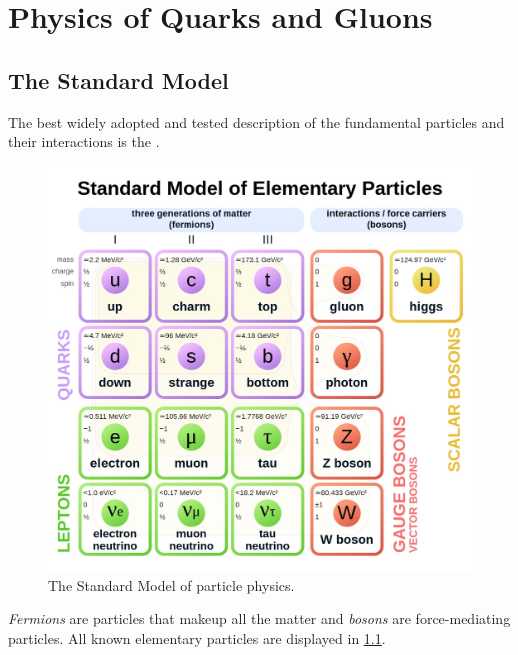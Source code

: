 \chapter{Physics of Quarks and Gluons}

\section{The Standard Model}
\label{sec:sm}
The best widely adopted and tested description of the fundamental particles and their interactions is the \SM \cite{pdg}. 
\begin{figure}[htb]
    \centering
    \includegraphics[width=0.6\linewidth]{src/img/sm.jpg}
    \caption[The Standard Model of particle physics.]{The Standard Model of particle physics. \footnotemark}
    \label{fig:sm}
\end{figure}
\emph{Fermions} are particles that makeup all the matter and \emph{bosons} are force-mediating particles.
All known elementary particles are displayed in \cref{fig:sm}.

